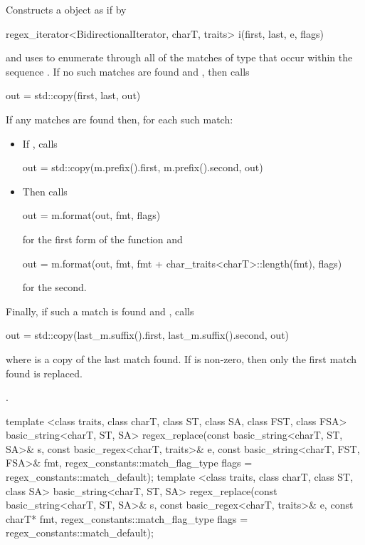 \begin{itemdescr}
\pnum
{}%
%
\effects
Constructs a  object 
as if by
\begin{codeblock}
regex_iterator<BidirectionalIterator, charT, traits> i(first, last, e, flags)
\end{codeblock}
and uses  to enumerate through all
of the matches  of type  
that occur within the sequence .
If no such
matches are found and
, then calls
\begin{codeblock}
out = std::copy(first, last, out)
\end{codeblock}
If any matches are found then, for each such match:
\begin{itemize}
\item
If , calls 
\begin{codeblock}
out = std::copy(m.prefix().first, m.prefix().second, out)
\end{codeblock}
\item
Then calls
\begin{codeblock}
out = m.format(out, fmt, flags)
\end{codeblock}
for the first form of the function and
\begin{codeblock}
out = m.format(out, fmt, fmt + char_traits<charT>::length(fmt), flags)
\end{codeblock}
for the second.
\end{itemize}
Finally, if such a match
is found and ,
calls
\begin{codeblock}
out = std::copy(last_m.suffix().first, last_m.suffix().second, out)
\end{codeblock}
where  is a copy of the last match
found. If  
is non-zero, then only the first match found is replaced.

\pnum\returns  {}.
\end{itemdescr}

%
\begin{itemdecl}
template <class traits, class charT, class ST, class SA, class FST, class FSA>
  basic_string<charT, ST, SA>
  regex_replace(const basic_string<charT, ST, SA>& s,
                const basic_regex<charT, traits>& e,
                const basic_string<charT, FST, FSA>& fmt,
                regex_constants::match_flag_type flags =
                  regex_constants::match_default); 
template <class traits, class charT, class ST, class SA>
  basic_string<charT, ST, SA>
  regex_replace(const basic_string<charT, ST, SA>& s,
                const basic_regex<charT, traits>& e,
                const charT* fmt,
                regex_constants::match_flag_type flags =
                  regex_constants::match_default);
\end{itemdecl}

